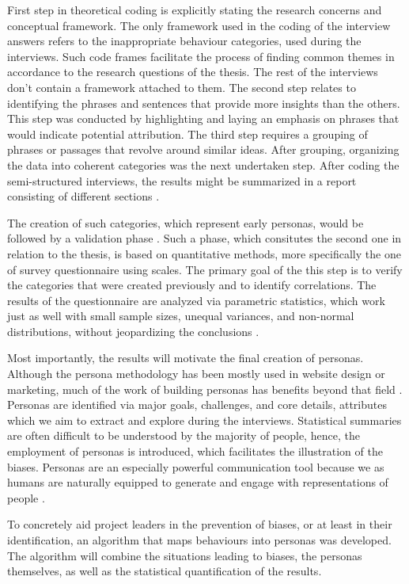 First step in theoretical coding is explicitly stating the research concerns and conceptual framework. The only framework used in the coding of the interview answers refers to the inappropriate behaviour categories, used during the interviews. Such code frames facilitate the process of finding common themes in accordance to the research questions of the thesis. The rest of the interviews don't contain a framework attached to them. The second step relates to identifying the phrases and sentences that provide more insights than the others. This step was conducted by highlighting and laying an emphasis on phrases that would indicate potential attribution. The third step requires a grouping of phrases or passages that revolve around similar ideas. After grouping, organizing the data into coherent categories was the next undertaken step. After coding the semi-structured interviews, the results might be summarized in a report consisting of different sections \cite{Yin2009}.

The creation of such categories, which represent early personas, would be followed by a validation phase \cite{Miaskiewicz2008}. Such a phase, which consitutes the second one in relation to the thesis, is based on quantitative methods, more specifically the one of survey questionnaire using scales. The primary goal of the this step is to verify the categories that were created previously and to identify correlations. The results of the questionnaire are analyzed via parametric statistics, which work just as well with small sample sizes, unequal variances, and non-normal distributions, without jeopardizing the conclusions \cite{Norman2010}.

Most importantly, the results will motivate the final creation of personas. Although the persona methodology has been mostly used in website design or marketing, much of the work of building personas has benefits beyond that field \cite{Madsen2014}. Personas are identified via major goals, challenges, and core details, attributes which we aim to extract and explore during the interviews. Statistical summaries are often difficult to be understood by the majority of people, hence, the employment of personas is introduced, which facilitates the illustration of the biases. Personas are an especially powerful communication tool because we as humans are naturally equipped to generate and engage with representations of people \cite{Grudin2006}. 

To concretely aid project leaders in the prevention of biases, or at least in their identification, an algorithm that maps behaviours into personas was developed. The algorithm will combine the situations leading to biases, the personas themselves, as well as the statistical quantification of the results.